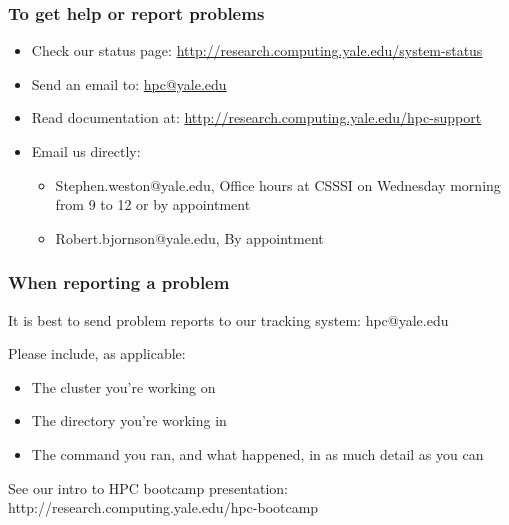 \documentclass[10pt]{beamer}
\begin{document}
\begin{frame}[fragile]
\frametitle{To get help or report problems}
\begin{itemize}
\item Check our status page: \url{http://research.computing.yale.edu/system-status}
\item Send an email to: \url{hpc@yale.edu}
\item Read documentation at: \url{http://research.computing.yale.edu/hpc-support}
\item Email us directly:
\begin{itemize}
\item Stephen.weston@yale.edu, Office hours at CSSSI on Wednesday morning from 9 to 12 or by appointment
\item Robert.bjornson@yale.edu, By appointment
\end{itemize}
\end{itemize}
\end{frame}

\begin{frame}[fragile]
\frametitle{When reporting a problem}
It is best to send problem reports to our tracking system: hpc@yale.edu 
\vspace{2mm}

Please include, as applicable:
\begin{itemize}
\item The cluster you're working on
\item The directory you're working in
\item The command you ran, and what happened, in as much detail as you can
\end{itemize}

See our intro to HPC bootcamp presentation:
http://research.computing.yale.edu/hpc-bootcamp

\end{frame}
\end{document}
